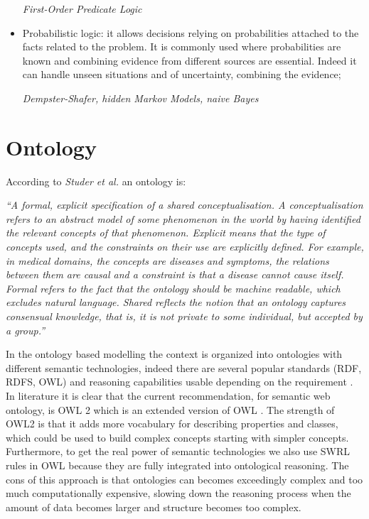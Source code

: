 \documentclass{thesisreport}
\begin{document}
\begin{itemize}
     \textit{First-Order Predicate Logic}
     
     \item Probabilistic logic: it allows decisions relying on probabilities attached to the facts related to the problem. It is commonly used where probabilities are known and combining evidence from different sources are essential. Indeed it can handle unseen situations and of uncertainty, combining the evidence; 
     
     \textit{Dempster-Shafer, hidden Markov Models, naive Bayes}
 \end{itemize}


\section{Ontology} \label{ontology}

According to \textit{Studer et al.} \cite{studer1998knowledge} an ontology is: 
\begin{center}
\textit{``A formal, explicit specification of a shared conceptualisation. A conceptualisation refers to an abstract model of some phenomenon in the world by having identified the relevant concepts of that phenomenon. Explicit means that the type of concepts used, and the constraints on their use are explicitly defined. For example, in medical domains, the concepts are diseases and symptoms, the relations between them are causal and a constraint is that a disease cannot cause itself. Formal refers to the fact that the ontology should be machine readable, which excludes natural language. Shared reflects the notion that an ontology captures consensual knowledge, that is, it is not private to some individual, but accepted by a group.”}
\end{center}


In the ontology based modelling the context is organized into ontologies with different semantic technologies, indeed there are several popular standards (RDF, RDFS, OWL) and reasoning capabilities usable depending on the requirement \cite{perera2014context}. 
In literature it is clear that the current recommendation, for semantic web ontology, is OWL 2 which is an extended version of OWL \cite{perera2014context}. The strength of OWL2 is that it adds more vocabulary for describing properties and classes, which could be used to build complex concepts starting with simpler concepts.
Furthermore, to get the real power of semantic technologies we also use SWRL rules in OWL because they are fully integrated into ontological reasoning. The cons of this approach is that ontologies can becomes exceedingly complex and too much computationally expensive, slowing down the reasoning process when the amount of data becomes larger and structure becomes too complex.
\end{document}
